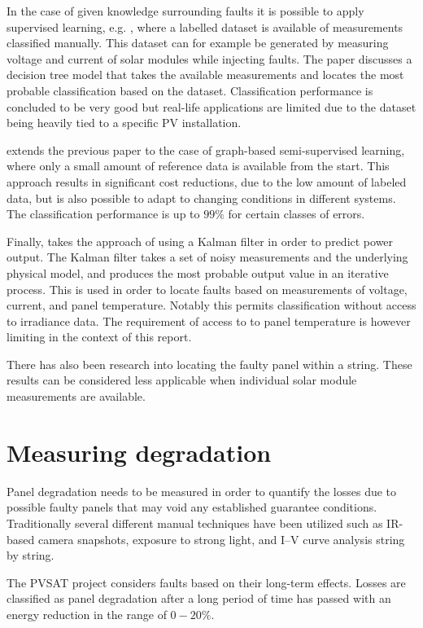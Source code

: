 In the case of given knowledge surrounding faults it is possible to apply supervised learning, e.g. \cite{Zhao2012tree},
where a labelled dataset is available of measurements classified manually.
This dataset can for example be generated by measuring voltage and current of solar modules while injecting faults.
The paper discusses a decision tree model that takes the available measurements and locates the most probable classification based on the dataset.
Classification performance is concluded to be very good but real-life applications are limited due to the dataset being heavily tied to a specific PV installation.

\cite{Zhao2013graph} extends the previous paper to the case of graph-based semi-supervised learning, where only a small amount of reference data is available from the start.
This approach results in significant cost reductions, due to the low amount of labeled data, but is also possible to adapt to changing conditions in different systems.
The classification performance is up to $99\%$ for certain classes of errors.

Finally, \cite{Kang2012} takes the approach of using a Kalman filter in order to predict power output.
The Kalman filter takes a set of noisy measurements and the underlying physical model, and produces the most probable output value in an iterative process.
This is used in order to locate faults based on measurements of voltage, current, and panel temperature.
Notably this permits classification without access to irradiance data.
The requirement of access to to panel temperature is however limiting in the context of this report.

There has also been research into locating the faulty panel within a string\cite{Lin2012}.
These results can be considered less applicable when individual solar module measurements are available.

\section{Measuring degradation}
Panel degradation needs to be measured in order to quantify the losses due to possible faulty panels that may void any established guarantee conditions.
Traditionally several different manual techniques have been utilized\cite{Munoz2011} such as IR-based camera snapshots, exposure to strong light, and I–V curve analysis string by string.

The PVSAT project\cite{Stettler2005} considers faults based on their long-term effects.
Losses are classified as panel degradation after a long period of time has passed with an energy reduction in the range of $0-20\%$.

